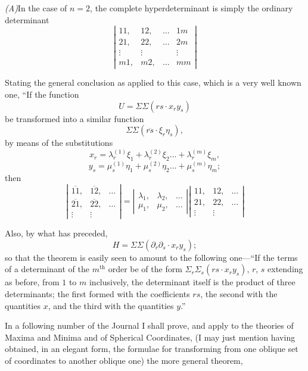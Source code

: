 \documentclass[11pt,a4paper]{article}
\theoremstyle{plain}
\theoremstyle{definition}
\theoremstyle{remark}
\begin{document}
\textit{(A)}\quad In the case of $n=2$, the complete hyperdeterminant is simply the ordinary
determinant
\[
\left|\begin{array}{cccc}
11, & 12, & \ldots & 1m \\
21, & 22, & \ldots & 2m \\
\vdots & \vdots & & \vdots \\
m1, & m2, & \ldots & mm
\end{array}\right|
\]

Stating the general conclusion as applied to this case, which is a very well known one,
``If the function
\[
U = \Sigma\Sigma(rs \cdot x_r y_s)
\]
be transformed into a similar function
\[
\Sigma\Sigma(\overline{rs} \cdot \xi_r \eta_s),
\]
by means of the substitutions
\[
x_r = \lambda_r^{(1)} \xi_1 + \lambda_r^{(2)} \xi_2 \ldots + \lambda_r^{(m)} \xi_m,
\]
\[
y_s = \mu_s^{(1)} \eta_1 + \mu_s^{(2)} \eta_2 \ldots + \mu_s^{(m)} \eta_m;
\]
then
\[
\left|\begin{array}{cccc}
\overline{11}, & \overline{12}, & \ldots \\
\overline{21}, & \overline{22}, & \ldots \\
\vdots & \vdots
\end{array}\right|
=
\left|\begin{array}{cccc}
\lambda_1, & \lambda_2, & \ldots \\
\mu_1, & \mu_2, & \ldots
\end{array}\right|
\left|\begin{array}{cccc}
11, & 12, & \ldots \\
21, & 22, & \ldots \\
\vdots & \vdots
\end{array}\right|
\]

Also, by what has preceded,
\[
H = \Sigma\Sigma(\partial_r \partial_s \cdot x_r y_s);
\]
so that the theorem is easily seen to amount to the following one---``If the terms of
a determinant of the $m^{\text{th}}$ order be of the form $\Sigma_r \Sigma_s (rs \cdot x_r y_s)$, $r$, $s$ extending as
before, from $1$ to $m$ inclusively, the determinant itself is the product of three determinants;
the first formed with the coefficients $rs$, the second with the quantities $x$,
and the third with the quantities $y$.''

\newpage
In a following number of the Journal I shall prove, and apply to the theories of
Maxima and Minima and of Spherical Coordinates, (I may just mention having obtained,
in an elegant form, the formulae for transforming from one oblique set of coordinates
to another oblique one) the more general theorem,
\end{document}

